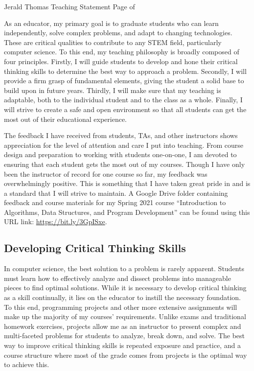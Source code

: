 \newpage

\setcounter{page}{1}
\makecvfooter
  {Jerald Thomas}
  {Teaching Statement}
  {Page \thepage \hspace{1pt} of \pageref{teaching_last}}

\makecvheader[C]
\doublespacing


As an educator, my primary goal is to graduate students who can learn independently, solve complex problems, and adapt to changing technologies. These are critical qualities to contribute to any STEM field, particularly computer science. To this end, my teaching philosophy is broadly composed of four principles. Firstly, I will guide students to develop and hone their critical thinking skills to determine the best way to approach a problem. Secondly, I will provide a firm grasp of fundamental elements, giving the student a solid base to build upon in future years. Thirdly, I will make sure that my teaching is adaptable, both to the individual student and to the class as a whole. Finally, I will strive to create a safe and open environment so that all students can get the most out of their educational experience.

The feedback I have received from students, TAs, and other instructors shows appreciation for the level of attention and care I put into teaching. From course design and preparation to working with students one-on-one, I am devoted to ensuring that each student gets the most out of my courses. Though I have only been the instructor of record for one course so far, my feedback was overwhelmingly positive. This is something that I have taken great pride in and is a standard that I will strive to maintain. A Google Drive folder containing feedback and course materials for my Spring 2021 course ``Introduction to Algorithms, Data Structures, and Program Development'' can be found using this URL link: \url{https://bit.ly/3GpISxe}.


\subsection*{Developing Critical Thinking Skills}
\vspace{-0.5cm}
In computer science, the best solution to a problem is rarely apparent. Students must learn how to effectively analyze and dissect problems into manageable pieces to find optimal solutions. While it is necessary to develop critical thinking as a skill continually, it lies on the educator to instill the necessary foundation. To this end, programming projects and other more extensive assignments will make up the majority of my courses’ requirements. Unlike exams and traditional homework exercises, projects allow me as an instructor to present complex and multi-faceted problems for students to analyze, break down, and solve. The best way to improve critical thinking skills is repeated exposure and practice, and a course structure where most of the grade comes from projects is the optimal way to achieve this.

